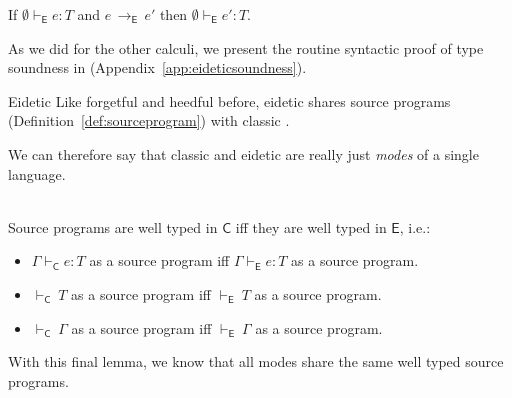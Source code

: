 \documentclass[9pt]{extarticle}
\newcommand{\ottnt}[1]{\mathit{#1}}
\begin{document}
{\begin{lemma}
  If $ \emptyset   \vdash _{  \mathsf{E}  }  \ottnt{e}  :  \ottnt{T} $ and $\ottnt{e} \,  \longrightarrow _{  \mathsf{E}  }  \, \ottnt{e'}$ then $ \emptyset   \vdash _{  \mathsf{E}  }  \ottnt{e'}  :  \ottnt{T} $.
\end{lemma}

\else

As we did for the other calculi, we present the
routine syntactic proof of type soundness in 
(Appendix~\ref{app:eideticsoundness}). 

\fi}
\ifpopl Eidetic \else Like forgetful and heedful \lambdah before,
eidetic \fi \lambdah shares source programs
(Definition~\ref{def:sourceprogram}) with classic
\lambdah. {\ifpopl
We can therefore say that classic and eidetic \lambdah are really
  just \textit{modes} of a single language.
\begin{lemma} ~ \\
  \noindent
  Source programs are well typed in $ \mathsf{C} $ iff they are well typed in
  $ \mathsf{E} $, i.e.:
\begin{itemize}
  \item $ \Gamma   \vdash _{  \mathsf{C}  }  \ottnt{e}  :  \ottnt{T} $ as a source program iff $ \Gamma   \vdash _{  \mathsf{E}  }  \ottnt{e}  :  \ottnt{T} $ as a source program.
  \item $ \mathord{  \vdash _{  \mathsf{C}  } }~ \ottnt{T} $ as a source program iff $ \mathord{  \vdash _{  \mathsf{E}  } }~ \ottnt{T} $ as a source program.
  \item $ \mathord{  \vdash _{  \mathsf{C}  } }~ \Gamma $ as a source program iff $ \mathord{  \vdash _{  \mathsf{E}  } }~ \Gamma $ as a source program.
  \end{itemize}
\end{lemma}


\else 
With this final lemma, we know that all modes share the same well
typed source programs. \fi}
\end{document}
